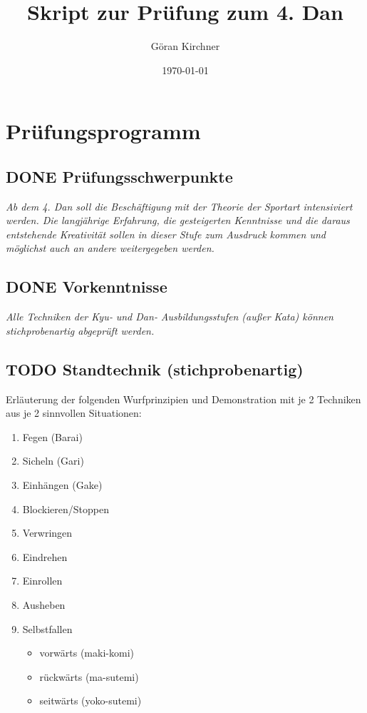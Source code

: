 \documentclass[11pt]{article}
\author{Göran Kirchner}
\date{\today}
\title{Skript zur Prüfung zum 4. Dan}
\begin{document}
\maketitle
\tableofcontents


\section{Prüfungsprogramm}
\label{sec:org400afce}

\subsection{{\bfseries\sffamily DONE} Prüfungsschwerpunkte}
\label{sec:org21b9a0f}
\emph{Ab dem 4. Dan soll die Beschäftigung mit der Theorie der Sportart intensiviert werden.
Die langjährige Erfahrung, die gesteigerten Kenntnisse und die daraus entstehende Kreativität sollen in dieser Stufe zum Ausdruck kommen und möglichst auch an andere weitergegeben werden.}

\subsection{{\bfseries\sffamily DONE} Vorkenntnisse}
\label{sec:org0ff9001}
\emph{Alle Techniken der Kyu‐ und Dan‐ Ausbildungsstufen (außer Kata) können stichprobenartig abgeprüft werden.}

\subsection{{\bfseries\sffamily TODO} Standtechnik (stichprobenartig)}
\label{sec:org07ba888}

Erläuterung der folgenden Wurfprinzipien und Demonstration mit je 2 Techniken aus je 2 sinnvollen Situationen:
\begin{enumerate}
\item Fegen (Barai)
\item Sicheln (Gari)
\item Einhängen (Gake)
\item Blockieren/Stoppen
\item Verwringen
\item Eindrehen
\item Einrollen
\item Ausheben
\item Selbstfallen
\begin{itemize}
\item vorwärts (maki-komi)
\item rückwärts (ma-sutemi)
\item seitwärts (yoko-sutemi)
\end{itemize}
\end{enumerate}
\end{document}
